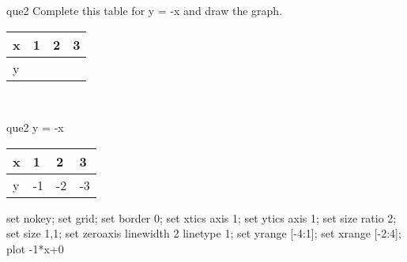 \documentclass[13.5pt, varwidth=true]{beamer}
\begin{document}
\begin{frame}[shrink=19,fragile]
	\begin{beamercolorbox}[rounded=true, left, shadow=true,wd=14.8cm]{que2}
		 Complete this table for y = -x and draw the graph. \\[0.3cm] \renewcommand{\arraystretch}{1.2}\begin{tabular}{|C|C|C|C|} \hline x & 1 & 2 & 3 \\ \hline y & & & \\ \hline \end{tabular}\\[0.3cm]
	\end{beamercolorbox}
\end{frame}
\begin{frame}[shrink=19,fragile]
	\begin{beamercolorbox}[rounded=true, left, shadow=true,wd=14.8cm]{que2}
		y = -x\renewcommand{\arraystretch}{1.2}\begin{tabular}{|C|C|C|C|} \hline x & 1 & 2 & 3 \\ \hline y & -1 & -2 & -3\\ \hline \end{tabular}\begin{gnuplot}[terminal=pdf] set nokey; set grid; set border 0; set xtics axis 1; set ytics axis 1; set size ratio 2; set size 1,1; set zeroaxis linewidth 2 linetype 1; set yrange [-4:1]; set xrange [-2:4]; plot -1*x+0 \end{gnuplot}
	\end{beamercolorbox}
\end{frame}
\end{document}
